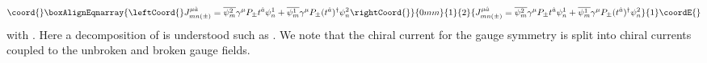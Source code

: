 \documentclass[a4paper,12pt]{article}
\begin{document}
\begin{eqnarray}\coord{}\boxAlignEqnarray{\leftCoord{}
J^{\mu{\hat a}}_{mn(\pm)}=\overline{\psi^2_m}\gamma^\mu
P_{\pm}t^{\hat a}\psi^1_n+\overline{\psi^1_m}\gamma^\mu
P_{\pm}(t^{\hat a})^\dagger\psi^2_n
\rightCoord{}}{0mm}{1}{2}{
J^{\mu{\hat a}}_{mn(\pm)}=\overline{\psi^2_m}\gamma^\mu
P_{\pm}t^{\hat a}\psi^1_n+\overline{\psi^1_m}\gamma^\mu
P_{\pm}(t^{\hat a})^\dagger\psi^2_n
}{1}\coordE{}\end{eqnarray}
with \coordHE{}. 
Here a decomposition of \coordHE{} is understood 
such as \coordHE{}. 
We note that the chiral
current for the \coordHE{} gauge symmetry is split into chiral
currents coupled to the unbroken and broken gauge fields. 
\end{document}
